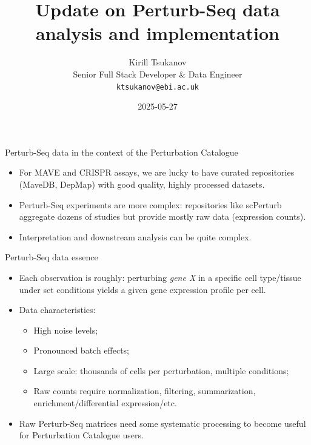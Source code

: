 \documentclass[handout]{beamer}
\title{Update on Perturb-Seq data analysis and implementation}
\date{2025-05-27}
\author{Kirill Tsukanov \\ Senior Full Stack Developer \& Data Engineer \\ \texttt{ktsukanov@ebi.ac.uk}}
\institute{Perturbation Catalogue All-Hands Meeting}
\begin{document}
\begin{frame}
    \titlepage
\end{frame}

\begin{frame}{Perturb-Seq data in the context of the Perturbation Catalogue}
    \begin{itemize}
        \item For MAVE and CRISPR assays, we are lucky to have curated repositories (MaveDB, DepMap) with good quality, highly processed datasets.
        \item Perturb-Seq experiments are more complex: repositories like scPerturb aggregate dozens of studies but provide mostly raw data (expression counts).
        \item Interpretation and downstream analysis can be quite complex.
    \end{itemize}
\end{frame}

\begin{frame}{Perturb-Seq data essence}
    \begin{itemize}
        \item Each observation is roughly: perturbing \emph{gene X} in a specific cell type/tissue under set conditions yields a given gene expression profile per cell.
        \item Data characteristics:
        \begin{itemize}
            \item High noise levels;
            \item Pronounced batch effects;
            \item Large scale: thousands of cells per perturbation, multiple conditions;
            \item Raw counts require normalization, filtering, summarization, enrichment/differential expression/etc.
        \end{itemize}
        \item Raw Perturb-Seq matrices need some systematic processing to become useful for Perturbation Catalogue users.
    \end{itemize}
\end{frame}
\end{document}
